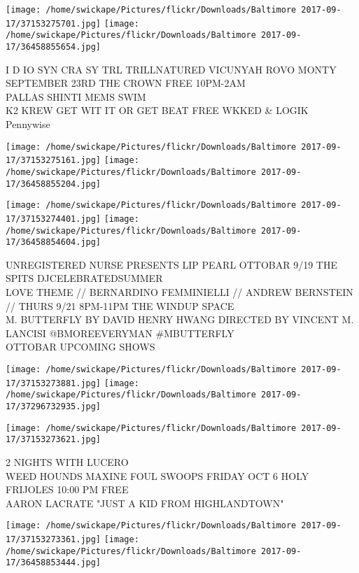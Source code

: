 \documentclass[10pt,letterpaper]{article}
\begin{document}
\texttt{[image: /home/swickape/Pictures/flickr/Downloads/Baltimore 2017-09-17/37153275701.jpg]}
\texttt{[image: /home/swickape/Pictures/flickr/Downloads/Baltimore 2017-09-17/36458855654.jpg]}

I D IO SYN CRA SY TRL TRILLNATURED VICUNYAH ROVO MONTY SEPTEMBER 23RD THE CROWN FREE 10PM{-}2AM\\
PALLAS SHINTI MEMS SWIM\\
K2 KREW GET WIT IT OR GET BEAT FREE WKKED \& LOGIK\\
Pennywise
\pagebreak

\texttt{[image: /home/swickape/Pictures/flickr/Downloads/Baltimore 2017-09-17/37153275161.jpg]}
\texttt{[image: /home/swickape/Pictures/flickr/Downloads/Baltimore 2017-09-17/36458855204.jpg]}

\texttt{[image: /home/swickape/Pictures/flickr/Downloads/Baltimore 2017-09-17/37153274401.jpg]}
\texttt{[image: /home/swickape/Pictures/flickr/Downloads/Baltimore 2017-09-17/36458854604.jpg]}

UNREGISTERED NURSE PRESENTS LIP PEARL OTTOBAR 9/19 THE SPITS DJCELEBRATEDSUMMER\\
LOVE THEME // BERNARDINO FEMMINIELLI // ANDREW BERNSTEIN // THURS 9/21 8PM{-}11PM THE WINDUP SPACE\\
M. BUTTERFLY BY DAVID HENRY HWANG DIRECTED BY VINCENT M. LANCISI @BMOREEVERYMAN \#MBUTTERFLY\\
OTTOBAR UPCOMING SHOWS
\pagebreak

\texttt{[image: /home/swickape/Pictures/flickr/Downloads/Baltimore 2017-09-17/37153273881.jpg]}
\texttt{[image: /home/swickape/Pictures/flickr/Downloads/Baltimore 2017-09-17/37296732935.jpg]}

\vspace{0.25in}
\texttt{[image: /home/swickape/Pictures/flickr/Downloads/Baltimore 2017-09-17/37153273621.jpg]}

2 NIGHTS WITH LUCERO\\
WEED HOUNDS MAXINE FOUL SWOOPS FRIDAY OCT 6 HOLY FRIJOLES 10:00 PM FREE\\
AARON LACRATE "JUST A KID FROM HIGHLANDTOWN"
\pagebreak

\texttt{[image: /home/swickape/Pictures/flickr/Downloads/Baltimore 2017-09-17/37153273361.jpg]}
\texttt{[image: /home/swickape/Pictures/flickr/Downloads/Baltimore 2017-09-17/36458853444.jpg]}
\end{document}

